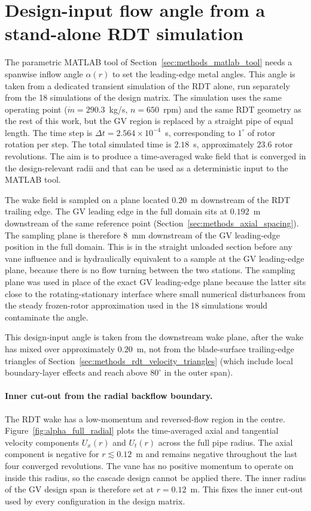 \section{Design-input flow angle from a stand-alone RDT simulation}
\label{sec:methods_design_input_baseline}

The parametric MATLAB tool of Section~\ref{sec:methods_matlab_tool} needs a spanwise inflow angle $\alpha(r)$ to set the leading-edge metal angles. This angle is taken from a dedicated transient simulation of the RDT alone, run separately from the 18 simulations of the design matrix. The simulation uses the same operating point ($\dot m = 290.3$~kg/s, $n = 650$~rpm) and the same RDT geometry as the rest of this work, but the GV region is replaced by a straight pipe of equal length. The time step is $\Delta t = 2.564\times 10^{-4}$~s, corresponding to $1^\circ$ of rotor rotation per step. The total simulated time is $2.18$~s, approximately $23.6$ rotor revolutions. The aim is to produce a time-averaged wake field that is converged in the design-relevant radii and that can be used as a deterministic input to the MATLAB tool.

The wake field is sampled on a plane located $0.20$~m downstream of the RDT trailing edge. The GV leading edge in the full domain sits at $0.192$~m downstream of the same reference point (Section~\ref{sec:methods_axial_spacing}). The sampling plane is therefore $8$~mm downstream of the GV leading-edge position in the full domain. This is in the straight unloaded section before any vane influence and is hydraulically equivalent to a sample at the GV leading-edge plane, because there is no flow turning between the two stations. The sampling plane was used in place of the exact GV leading-edge plane because the latter sits close to the rotating-stationary interface where small numerical disturbances from the steady frozen-rotor approximation used in the 18 simulations would contaminate the angle.

This design-input angle is taken from the downstream wake plane, after the wake has mixed over approximately $0.20$~m, not from the blade-surface trailing-edge triangles of Section~\ref{sec:methods_rdt_velocity_triangles} (which include local boundary-layer effects and reach above $80^\circ$ in the outer span).

\paragraph{Inner cut-out from the radial backflow boundary.}
The RDT wake has a low-momentum and reversed-flow region in the centre. Figure~\ref{fig:alpha_full_radial} plots the time-averaged axial and tangential velocity components $U_x(r)$ and $U_t(r)$ across the full pipe radius. The axial component is negative for $r \lesssim 0.12$~m and remains negative throughout the last four converged revolutions. The vane has no positive momentum to operate on inside this radius, so the cascade design cannot be applied there. The inner radius of the GV design span is therefore set at $r = 0.12$~m. This fixes the inner cut-out used by every configuration in the design matrix.

